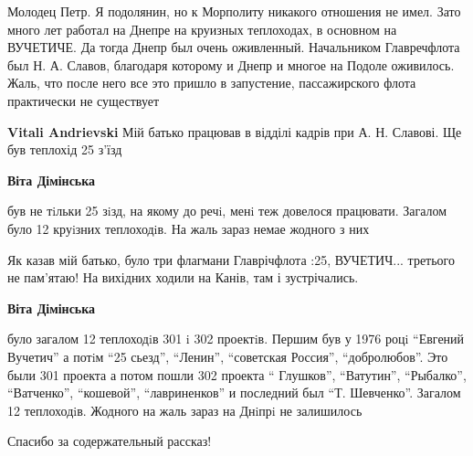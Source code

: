  
 
 
 
 
\zzSecCmt

\begin{itemize} %

Молодец Петр. Я подолянин, но к Морполиту никакого отношения не имел. Зато
много лет работал на Днепре на круизных теплоходах, в основном на ВУЧЕТИЧЕ. Да
тогда Днепр был очень оживленный. Начальником Главречфлота был Н. А. Славов,
благодаря которому и Днепр и многое на Подоле оживилось. Жаль, что после него
все это пришло в запустение, пассажирского флота практически не существует

\begin{itemize} %
\textbf{Vitali Andrievski} Мій батько працював в відділі кадрів при А. Н. Славові. Ще був теплохід 25 з'їзд

\textbf{Віта Дімінська} 

був не тiльки 25 зiзд, на якому до речi, менi теж довелося працювати. Загалом
було 12 круiзних теплоходiв. На жаль зараз немае жодного з них



Як казав мій батько, було три флагмани Главрічфлота :25, ВУЧЕТИЧ... третього не
пам'ятаю! На вихідних ходили на Канів, там і зустрічались.


\textbf{Віта Дімінська} 

було загалом 12 теплоходiв 301 i 302 проектiв. Першим був у 1976 роцi \enquote{Евгений
Вучетич} а потiм \enquote{25 сьезд}, \enquote{Ленин}, \enquote{советская Россия}, \enquote{добролюбов}. Это
были 301 проекта а потом пошли 302 проекта \enquote{ Глушков}, \enquote{Ватутин}, \enquote{Рыбалко},
\enquote{Ватченко}, \enquote{кошевой}, \enquote{лавриненков} и последний был \enquote{Т. Шевченко}. Загалом 12
теплоходiв. Жодного на жаль зараз на Днiпрi не залишилось

\end{itemize} %

Спасибо за содержательный рассказ!



\end{itemize}

